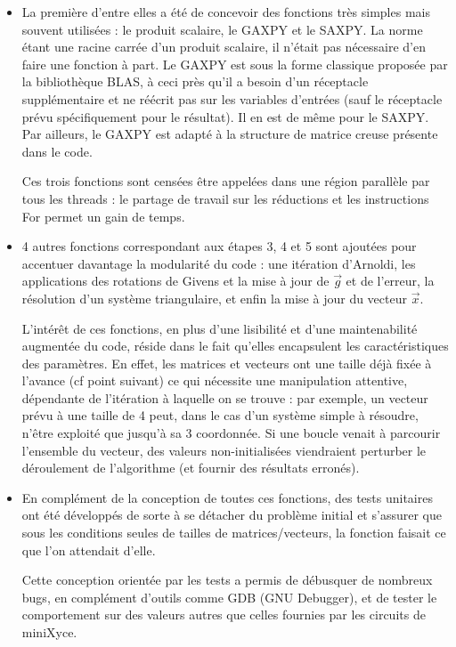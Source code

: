 \documentclass[11pt,a4paper,oneside]{memoir}
\theoremstyle{definition}
\theoremstyle{remark}
\theoremstyle{plain}
\begin{document}
\begin{itemize}
\item La première d'entre elles a été de concevoir des fonctions très simples mais souvent utilisées : le produit scalaire, le GAXPY et le SAXPY. La norme étant une racine carrée d'un produit scalaire, il n'était pas nécessaire d'en faire une fonction à part. Le GAXPY est sous la forme classique proposée par la bibliothèque BLAS, à ceci près qu'il a besoin d'un réceptacle supplémentaire et ne réécrit pas sur les variables d'entrées (sauf le réceptacle prévu spécifiquement pour le résultat). Il en est de même pour le SAXPY. Par ailleurs, le GAXPY est adapté à la structure de matrice creuse présente dans le code.

Ces trois fonctions sont censées être appelées dans une région parallèle par tous les threads : le partage de travail sur les réductions et les instructions For permet un gain de temps.

\item 4 autres fonctions correspondant aux étapes 3, 4 et 5 sont ajoutées pour accentuer davantage la modularité du code : une itération d'Arnoldi, les applications des rotations de Givens et la mise à jour de $\vec{g}$ et de l'erreur, la résolution d'un système triangulaire, et enfin la mise à jour du vecteur $\vec{x}$.

L'intérêt de ces fonctions, en plus d'une lisibilité et d'une maintenabilité augmentée du code, réside dans le fait qu'elles encapsulent les caractéristiques des paramètres. En effet, les matrices et vecteurs ont une taille déjà fixée à l'avance (cf point suivant) ce qui nécessite une manipulation attentive, dépendante de l'itération à laquelle on se trouve : par exemple, un vecteur prévu à une taille de 4 peut, dans le cas d'un système simple à résoudre, n'être exploité que jusqu'à sa 3 coordonnée. Si une boucle venait à parcourir l'ensemble du vecteur, des valeurs non-initialisées viendraient perturber le déroulement de l'algorithme (et fournir des résultats erronés).

\item En complément de la conception de toutes ces fonctions, des tests unitaires ont été développés de sorte à se détacher du problème initial et s'assurer que sous les conditions seules de tailles de matrices/vecteurs, la fonction faisait ce que l'on attendait d'elle.

Cette conception orientée par les tests a permis de débusquer de nombreux bugs, en complément d'outils comme GDB (GNU Debugger), et de tester le comportement sur des valeurs autres que celles fournies par les circuits de miniXyce.


\end{itemize}
\end{document}
